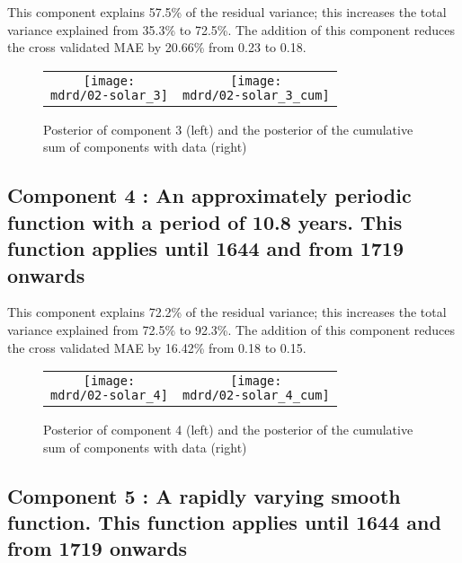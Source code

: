 \documentclass{article} %
\begin{document}


This component explains 57.5\% of the residual variance; this increases the total variance explained from 35.3\% to 72.5\%.
The addition of this component reduces the cross validated MAE by 20.66\% from 0.23 to 0.18.


\begin{figure}[H]
\newcommand{\wmgd}{0.5\columnwidth}
\newcommand{\hmgd}{3.0cm}
\newcommand{\mdrd}{figures/02-solar}
\newcommand{\mbm}{\hspace{-0.3cm}}
\begin{tabular}{cc}
\mbm \texttt{[image: \\mdrd/02-solar\_3]} & \texttt{[image: \\mdrd/02-solar\_3\_cum]}
\end{tabular}
\caption{Posterior of component 3 (left) and the posterior of the cumulative sum of components with data (right)}
\label{fig:comp3}
\end{figure}

\subsection{Component 4 : An approximately periodic function with a period of 10.8 years. This function applies until 1644 and from 1719 onwards}



This component explains 72.2\% of the residual variance; this increases the total variance explained from 72.5\% to 92.3\%.
The addition of this component reduces the cross validated MAE by 16.42\% from 0.18 to 0.15.


\begin{figure}[H]
\newcommand{\wmgd}{0.5\columnwidth}
\newcommand{\hmgd}{3.0cm}
\newcommand{\mdrd}{figures/02-solar}
\newcommand{\mbm}{\hspace{-0.3cm}}
\begin{tabular}{cc}
\mbm \texttt{[image: \\mdrd/02-solar\_4]} & \texttt{[image: \\mdrd/02-solar\_4\_cum]}
\end{tabular}
\caption{Posterior of component 4 (left) and the posterior of the cumulative sum of components with data (right)}
\label{fig:comp4}
\end{figure}

\subsection{Component 5 : A rapidly varying smooth function. This function applies until 1644 and from 1719 onwards}
\end{document}
